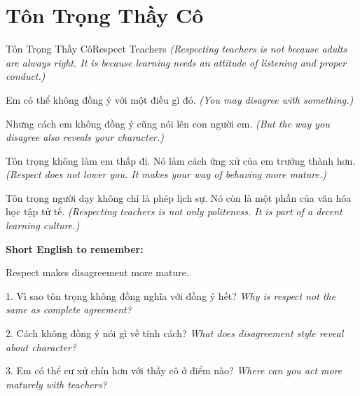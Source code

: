 \section{Tôn Trọng Thầy Cô}
\begin{truyen}{Tôn Trọng Thầy Cô}{Respect Teachers}
\textit{(Respecting teachers is not because adults are always right. It is because learning needs an attitude of listening and proper conduct.)}

Em có thể không đồng ý với một điều gì đó.
\textit{(You may disagree with something.)}

Nhưng cách em không đồng ý cũng nói lên con người em.
\textit{(But the way you disagree also reveals your character.)}

Tôn trọng không làm em thấp đi. Nó làm cách ứng xử của em trưởng thành hơn.
\textit{(Respect does not lower you. It makes your way of behaving more mature.)}
\end{truyen}

\begin{baihoc}
Tôn trọng người dạy không chỉ là phép lịch sự. Nó còn là một phần của văn hóa học tập tử tế.
\textit{(Respecting teachers is not only politeness. It is part of a decent learning culture.)}
\end{baihoc}

\begin{ghinhoanh}
\textbf{Short English to remember:}

Respect makes disagreement more mature.

\end{ghinhoanh}

\begin{tuhocnhanh}
1. Vì sao tôn trọng không đồng nghĩa với đồng ý hết? \textit{Why is respect not the same as complete agreement?}

2. Cách không đồng ý nói gì về tính cách? \textit{What does disagreement style reveal about character?}

3. Em có thể cư xử chín hơn với thầy cô ở điểm nào? \textit{Where can you act more maturely with teachers?}
\end{tuhocnhanh}
\ngancach

